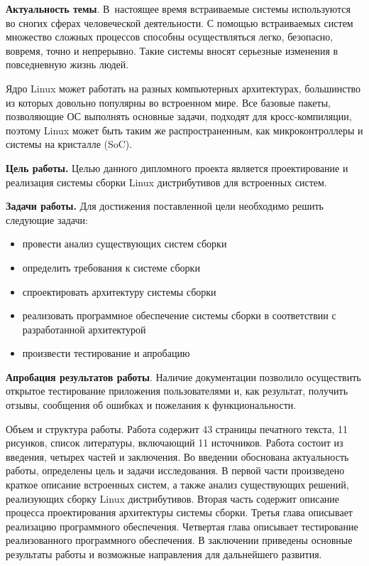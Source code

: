
\textbf{Актуальность темы}. В~настоящее время встраиваемые системы используются во сногих сферах человеческой деятельности. С помощью встраиваемых систем множество сложных процессов способны осуществляться легко, безопасно, вовремя, точно и непрерывно. Такие системы вносят серьезные изменения в повседневную жизнь людей.

Ядро Linux может работать на разных компьютерных архитектурах, большинство из которых довольно популярны во встроенном мире. Все базовые пакеты, позволяющие ОС выполнять основные задачи, подходят для кросс-компиляции, поэтому Linux может быть таким же распространенным, как микроконтроллеры и системы на кристалле (SoC).

\textbf{Цель работы.} Целью данного дипломного проекта является проектирование и реализация системы сборки Linux дистрибутивов для встроенных систем.

\textbf{Задачи работы.} Для достижения поставленной цели необходимо решить следующие задачи:

\begin{itemize}
  \item провести анализ существующих систем сборки
  \item определить требования к системе сборки
  \item спроектировать архитектуру системы сборки
  \item реализовать программное обеспечение системы сборки в соответствии с разработанной архитектурой
  \item произвести тестирование и апробацию
\end{itemize}

\textbf{Апробация результатов работы}. Наличие документации позволило осуществить открытое тестирование приложения пользователями и, как результат, получить отзывы, сообщения об ошибках и пожелания к функциональности.


Объем и структура работы.
Работа содержит 43 страницы печатного текста, 11 рисунков, список литературы, включающий 11 источников.
Работа состоит из введения, четырех частей и заключения.
Во введении обоснована актуальность работы, определены цель и задачи исследования.
В первой части произведено краткое описание встроенных систем, а также анализ существующих решений, реализующих сборку Linux дистрибутивов.
Вторая часть содержит описание процесса проектирования архитектуры системы сборки.
Третья глава описывает реализацию программного обеспечения.
Четвертая глава описывает тестирование реализованного программного обеспечения.
В заключении приведены основные результаты работы и возможные направления для дальнейшего развития.
\newpage
